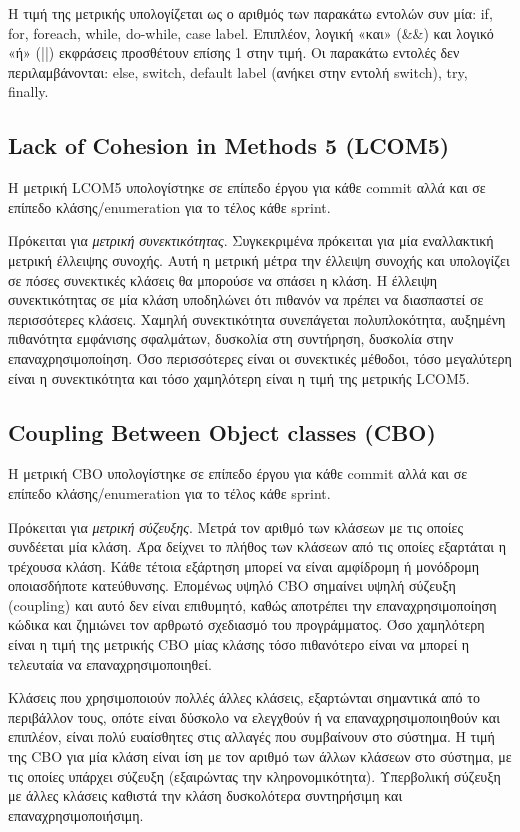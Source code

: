 Η τιμή της μετρικής υπολογίζεται ως ο αριθμός των παρακάτω εντολών συν
μία: if, for, foreach, while, do-while, case label. Επιπλέον, λογική «και»
(\&\&) και λογικό «ή» (||) εκφράσεις προσθέτουν επίσης 1 στην τιμή. Οι
παρακάτω εντολές δεν περιλαμβάνονται: else, switch, default label
(ανήκει στην εντολή switch), try, finally.


\subsection{Lack of Cohesion in Methods 5  (LCOM5)}

Η μετρική LCOM5 υπολογίστηκε σε επίπεδο έργου για κάθε commit αλλά και
σε επίπεδο κλάσης/enumeration για το τέλος κάθε sprint. 

Πρόκειται για \emph{μετρική συνεκτικότητας}. Συγκεκριμένα πρόκειται για
μία εναλλακτική μετρική έλλειψης συνοχής. Αυτή η μετρική μέτρα την
έλλειψη συνοχής και υπολογίζει σε πόσες συνεκτικές κλάσεις θα μπορούσε
να σπάσει η κλάση. Η έλλειψη συνεκτικότητας σε μία κλάση υποδηλώνει ότι
πιθανόν να πρέπει να διασπαστεί σε περισσότερες κλάσεις. Χαμηλή
συνεκτικότητα συνεπάγεται πολυπλοκότητα, αυξημένη πιθανότητα εμφάνισης
σφαλμάτων, δυσκολία στη συντήρηση, δυσκολία στην επαναχρησιμοποίηση. Όσο
περισσότερες είναι οι συνεκτικές μέθοδοι, τόσο μεγαλύτερη είναι η
συνεκτικότητα και τόσο χαμηλότερη είναι η τιμή της μετρικής LCOM5.

\subsection{Coupling Between Object classes (CBO)}

Η μετρική CBO υπολογίστηκε σε επίπεδο έργου για κάθε commit αλλά και σε
επίπεδο κλάσης/enumeration για το τέλος κάθε sprint. 

Πρόκειται για \emph{μετρική σύζευξης}. Μετρά τον αριθμό των κλάσεων με
τις οποίες συνδέεται μία κλάση. Άρα δείχνει το πλήθος των κλάσεων από
τις οποίες εξαρτάται η τρέχουσα κλάση. Κάθε τέτοια εξάρτηση μπορεί να
είναι αμφίδρομη ή μονόδρομη οποιασδήποτε κατεύθυνσης. Επομένως υψηλό CBO
σημαίνει υψηλή σύζευξη (coupling) και αυτό δεν είναι επιθυμητό, καθώς
αποτρέπει την επαναχρησιμοποίηση κώδικα και ζημιώνει τον αρθρωτό
σχεδιασμό του προγράμματος. Όσο χαμηλότερη είναι η τιμή της μετρικής CBO
μίας κλάσης τόσο πιθανότερο είναι να μπορεί η τελευταία να
επαναχρησιμοποιηθεί. 

Κλάσεις που χρησιμοποιούν πολλές άλλες κλάσεις, εξαρτώνται σημαντικά από
το περιβάλλον τους, οπότε είναι δύσκολο να ελεγχθούν ή να
επαναχρησιμοποιηθούν και επιπλέον, είναι πολύ ευαίσθητες στις αλλαγές
που συμβαίνουν στο σύστημα. Η τιμή της CBO για μία κλάση είναι ίση με
τον αριθμό των άλλων κλάσεων στο σύστημα, με τις οποίες υπάρχει σύζευξη
(εξαιρώντας την κληρονομικότητα). Υπερβολική σύζευξη με άλλες κλάσεις
καθιστά την κλάση δυσκολότερα συντηρήσιμη και επαναχρησιμοποιήσιμη.
